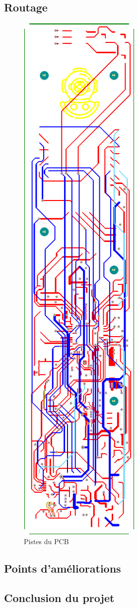 \subsection{Routage} \label{ssec:routage}
{
	\begin{figure}[h]
		\centering
		\includegraphics[height=0.615\pageheight]{Figures/Pistes}
		\caption{Pistes du PCB}
		\label{fig:pistes}
	\end{figure}
	
}
\clearpage

\subsection{Points d'améliorations} \label{ssec:pointAmel}
{}
\clearpage

\subsection{Conclusion du projet} \label{ssec:conclusionG}
{}
\clearpage
